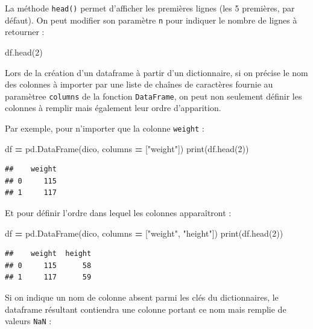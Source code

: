 \documentclass[12pt,]{book}
\newenvironment{Shaded}{\begin{snugshade}}{\end{snugshade}}
\newcommand{\DecValTok}[1]{\textcolor[rgb]{0.00,0.00,0.81}{#1}}
\newcommand{\StringTok}[1]{\textcolor[rgb]{0.31,0.60,0.02}{#1}}
\newcommand{\OperatorTok}[1]{\textcolor[rgb]{0.81,0.36,0.00}{\textbf{#1}}}
\newcommand{\BuiltInTok}[1]{#1}
\newcommand{\NormalTok}[1]{#1}
\numberwithin{equation}{section}
\numberwithin{countremarque}{section}
\begin{document}
La méthode \texttt{head()} permet d'afficher les premières lignes (les 5
premières, par défaut). On peut modifier son paramètre \texttt{n} pour
indiquer le nombre de lignes à retourner :

\begin{Shaded}
\begin{Highlighting}[]
\NormalTok{df.head(}\DecValTok{2}\NormalTok{)}
\end{Highlighting}
\end{Shaded}

Lors de la création d'un dataframe à partir d'un dictionnaire, si on
précise le nom des colonnes à importer par une liste de chaînes de
caractères fournie au paramètree \texttt{columns} de la fonction
\texttt{DataFrame}, on peut non seulement définir les colonnes à remplir
mais également leur ordre d'apparition.

Par exemple, pour n'importer que la colonne \texttt{weight} :

\begin{Shaded}
\begin{Highlighting}[]
\NormalTok{df }\OperatorTok{=}\NormalTok{ pd.DataFrame(dico, columns }\OperatorTok{=}\NormalTok{ [}\StringTok{"weight"}\NormalTok{])}
\BuiltInTok{print}\NormalTok{(df.head(}\DecValTok{2}\NormalTok{))}
\end{Highlighting}
\end{Shaded}

\begin{lstlisting}
##    weight
## 0     115
## 1     117
\end{lstlisting}

Et pour définir l'ordre dans lequel les colonnes apparaîtront :

\begin{Shaded}
\begin{Highlighting}[]
\NormalTok{df }\OperatorTok{=}\NormalTok{ pd.DataFrame(dico, columns }\OperatorTok{=}\NormalTok{ [}\StringTok{"weight"}\NormalTok{, }\StringTok{"height"}\NormalTok{])}
\BuiltInTok{print}\NormalTok{(df.head(}\DecValTok{2}\NormalTok{))}
\end{Highlighting}
\end{Shaded}

\begin{lstlisting}
##    weight  height
## 0     115      58
## 1     117      59
\end{lstlisting}

Si on indique un nom de colonne absent parmi les clés du dictionnaires,
le dataframe résultant contiendra une colonne portant ce nom mais
remplie de valeurs \texttt{NaN} :
\end{document}
